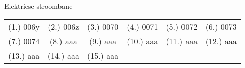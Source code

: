 \begin{eocexercises}{Elektriese stroombane}
\begin{enumerate}[noitemsep, label=\textbf{\arabic*}. ]
\end{enumerate}
\par \practiceinfo
 \par \begin{tabular}[h]{cccccc}
 (1.) 006y  &  (2.) 006z  &  (3.) 0070  &  (4.) 0071  &  (5.) 0072  &  (6.) 0073 \\
 (7.) 0074  &  (8.) aaa   &  (9.) aaa   &  (10.) aaa  &  (11.) aaa  &  (12.) aaa \\
 (13.) aaa  & (14.) aaa   &  (15.) aaa \end{tabular}
\end{eocexercises}

